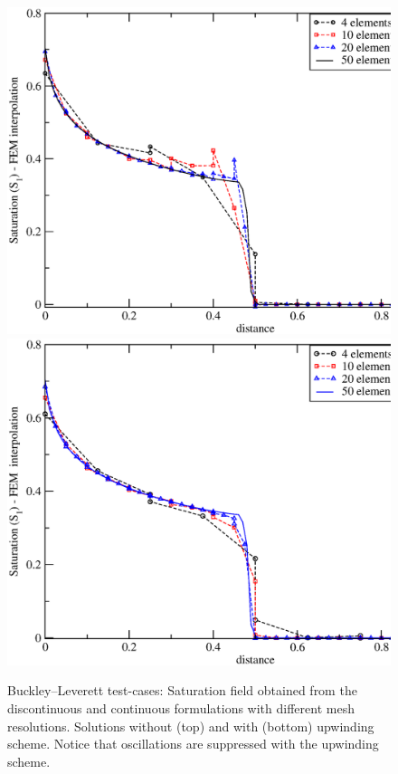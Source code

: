 \begin{figure}[h]
\vbox{
\hbox{\hspace{.3cm}\includegraphics[width=.9\textwidth]{diagrams/bl-dg-cent-4-10-20.eps}}
\vspace{-0.cm}
\hbox{\hspace{.3cm}\includegraphics[width=.9\textwidth]{diagrams/bl-dg-4-10-20.eps}}}
\caption{Buckley--Leverett test-cases: Saturation field obtained from the discontinuous and continuous formulations with different mesh resolutions. Solutions without (top) and with (bottom) upwinding scheme. Notice that oscillations are suppressed with the upwinding scheme.\label{bl-dg-cent-4-10-20}}
\end{figure}


